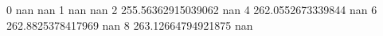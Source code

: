 0 nan nan
1 nan nan
2 255.56362915039062 nan
4 262.0552673339844 nan
6 262.8825378417969 nan
8 263.12664794921875 nan
